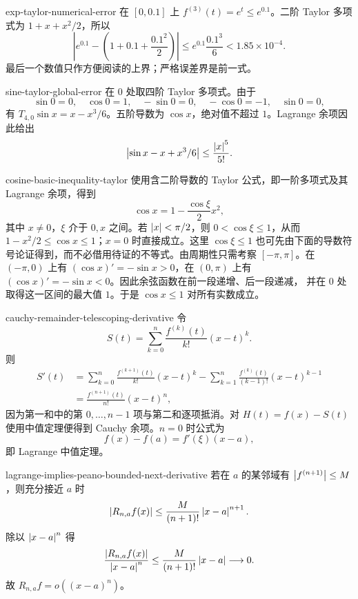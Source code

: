 \begin{solution}{exp-taylor-numerical-error}
在 \([0,0.1]\) 上 \(f^{(3)}(t)=e^t\le e^{0.1}\)。二阶 Taylor 多项式为
\(1+x+x^2/2\)，所以
\[
 \left|e^{0.1}-\left(1+0.1+\frac{0.1^2}{2}\right)\right|
 \le e^{0.1}\frac{0.1^3}{6}
 <1.85\times10^{-4}.
\]
最后一个数值只作方便阅读的上界；严格误差界是前一式。
\end{solution}

\begin{solution}{sine-taylor-global-error}
在 \(0\) 处取四阶 Taylor 多项式。由于
\[
 \sin0=0,\quad \cos0=1,\quad -\sin0=0,\quad-\cos0=-1,
\quad \sin0=0,
\]
有 \(T_{4,0}\sin x=x-x^3/6\)。五阶导数为 \(\cos x\)，绝对值不超过 \(1\)。Lagrange 余项因此给出
\[
 \left|\sin x-x+x^3/6\right|\le\frac{\left|x\right|^5}{5!}.
\]
\end{solution}

\begin{solution}{cosine-basic-inequality-taylor}
使用含二阶导数的 Taylor 公式，即一阶多项式及其 Lagrange 余项，得到
\[
 \cos x=1-\frac{\cos\xi}{2}x^2,
\]
其中 \(x\ne0\)，\(\xi\) 介于 \(0,x\) 之间。若 \(\left|x\right|<\pi/2\)，则 \(0<\cos\xi\le1\)，从而 \(1-x^2/2\le\cos x\le1\)；\(x=0\) 时直接成立。这里 \(\cos\xi\le1\) 也可先由下面的导数符号论证得到，而不必借用待证的不等式。由周期性只需考察
\([-\pi,\pi]\)。在 \((-\pi,0)\) 上有
\((\cos x)'=-\sin x>0\)，在 \((0,\pi)\) 上有
\((\cos x)'=-\sin x<0\)。因此余弦函数在前一段递增、后一段递减，
并在 \(0\) 处取得这一区间的最大值 \(1\)。于是
\(\cos x\le1\) 对所有实数成立。
\end{solution}

\begin{solution}{cauchy-remainder-telescoping-derivative}
令
\[
 S(t)=\sum_{k=0}^{n}\frac{f^{(k)}(t)}{k!}(x-t)^k.
\]
则
\[
 \begin{aligned}
 S'(t)
 &=\sum_{k=0}^{n}\frac{f^{(k+1)}(t)}{k!}(x-t)^k
   -\sum_{k=1}^{n}\frac{f^{(k)}(t)}{(k-1)!}(x-t)^{k-1}\\
 &=\frac{f^{(n+1)}(t)}{n!}(x-t)^n,
 \end{aligned}
\]
因为第一和中的第 \(0,\ldots,n-1\) 项与第二和逐项抵消。对
\(H(t)=f(x)-S(t)\) 使用中值定理便得到 Cauchy 余项。\(n=0\) 时公式为
\[
 f(x)-f(a)=f'(\xi)(x-a),
\]
即 Lagrange 中值定理。
\end{solution}

\begin{solution}{lagrange-implies-peano-bounded-next-derivative}
若在 \(a\) 的某邻域有 \(\left|f^{(n+1)}\right|\le M\)，则充分接近 \(a\) 时
\[
 \left|R_{n,a}f(x)\right|\le\frac{M}{(n+1)!}\left|x-a\right|^{n+1}.
\]
除以 \(\left|x-a\right|^n\) 得
\[
 \frac{\left|R_{n,a}f(x)\right|}{\left|x-a\right|^n}
 \le\frac{M}{(n+1)!}\left|x-a\right|\longrightarrow0.
\]
故 \(R_{n,a}f=o((x-a)^n)\)。
\end{solution}

